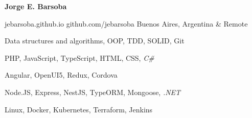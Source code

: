 \documentclass[11pt]{article} %
\begin{document}
\centerline{{\Huge \bf Jorge E. Barsoba}}

\bigskip

        {jebarsoba.github.io}
        {github.com/jebarsoba}
        {Buenos Aires, Argentina \& Remote}


      {Data structures and algorithms, OOP, TDD, SOLID, Git}

      {PHP, JavaScript, TypeScript, HTML, CSS, \textit{C\#}}

      {Angular, OpenUI5, Redux, Cordova}

      {Node.JS, Express, NestJS, TypeORM, Mongoose, \textit{.NET}}

      {Linux, Docker, Kubernetes, Terraform, Jenkins}

\end{document}
